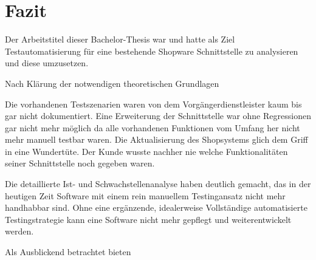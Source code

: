 \section{Fazit}
Der Arbeitstitel dieser Bachelor-Thesis war \dq{}\myTitel\dq{} und hatte als Ziel Testautomatisierung für eine bestehende Shopware Schnittstelle zu analysieren und diese umzusetzen.

Nach Klärung der notwendigen theoretischen Grundlagen 

Die vorhandenen Testszenarien waren von dem Vorgängerdienstleister kaum bis gar nicht dokumentiert. Eine Erweiterung der Schnittstelle war ohne Regressionen gar nicht mehr möglich da alle vorhandenen Funktionen vom Umfang her nicht mehr manuell testbar waren. Die Aktualisierung des Shopsystems glich dem Griff in eine Wundertüte. Der Kunde wusste nachher nie welche Funktionalitäten seiner Schnittstelle noch gegeben waren.

Die detaillierte Ist- und Schwachstellenanalyse haben deutlich gemacht, das in der heutigen Zeit Software mit einem rein manuellem Testingansatz nicht mehr handhabbar sind. Ohne eine ergänzende, idealerweise Vollständige automatisierte Testingstrategie kann eine Software nicht mehr gepflegt und weiterentwickelt werden.

Als Ausblickend betrachtet bieten 